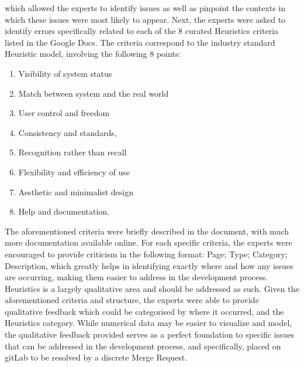 which allowed the experts to identify issues as well as pinpoint the contexts in which these issues were most likely to appear.
Next, the experts were asked to identify errors specifically related to each of the 8 curated Heuristics criteria listed in the Google Docs.
The criteria correspond to the industry standard Heuristic model, involving the following 8 points:
\begin{enumerate}
    \item Visibility of system status
    \item Match between system and the real world
    \item User control and freedom
    \item Consistency and standards,
    \item Recognition rather than recall
    \item Flexibility and efficiency of use
    \item Aesthetic and minimalist design
    \item Help and documentation.
\end{enumerate}
The aforementioned criteria were briefly described in the document, with much more documentation available online.
For each specific criteria, the experts were encouraged to provide criticism in the following format: Page; Type; Category; Description, which greatly helps in identifying exactly where and how any issues are occurring, making them easier to address in the development process.
Heuristics is a largely qualitative area and should be addressed as such.
Given the aforementioned criteria and structure, the experts were able to provide qualitative feedback which could be categorised by where it occurred, and the Heuristics category.
While numerical data may be easier to visualize and model, the qualitative feedback provided serves as a perfect foundation to specific issues that can be addressed in the development process, and specifically, placed on gitLab to be resolved by a discrete Merge Request.

